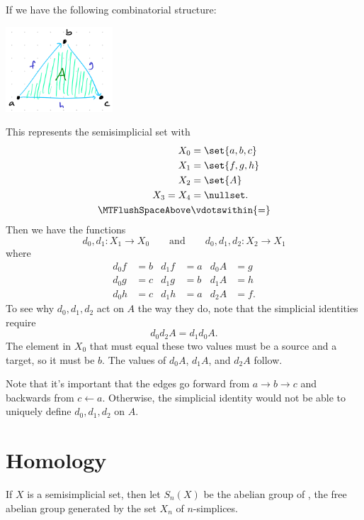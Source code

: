 \documentclass{standalone}
\begin{document}
\begin{example}
  If we have the following combinatorial structure:
  \begin{center}
    \includegraphics[width=0.3\textwidth]{18_905-200904-2.png} %
  \end{center}
  This represents the semisimplicial set with
  \begin{align*}
    X_0 &= \set{a, b, c} \\
    X_1 &= \set{f, g, h} \\
    X_2 &= \set{A} \\
    X_3 = X_4 &= \nullset. \\
    \MTFlushSpaceAbove
    &\vdotswithin{=}
  \end{align*}
  Then we have the functions
  \[
    d_0, d_1 \colon X_1 \to X_0
    \qquad \text{and} \qquad
    d_0, d_1, d_2 \colon X_2 \to X_1
  \]
  where
  \begin{align*}
    d_0 f &= b &
      d_1 f &= a &
      d_0 A &= g \\
    d_0 g &= c &
      d_1 g &= b &
      d_1 A &= h \\
    d_0 h &= c &
      d_1 h &= a &
      d_2 A &= f.
  \end{align*}
  To see why \(d_0, d_1, d_2\) act on \(A\) the way they do,
  note that the simplicial identities require
  \[
    d_0 d_2 A = d_1 d_0 A.
  \]
  The element in \(X_0\) that must equal these two values must be a source
  and a target, so it must be \(b\). The values of \(d_0 A\), \(d_1 A\),
  and \(d_2 A\) follow.
\end{example}

Note that it's important that the edges go forward from \(a \to b \to c\)
and backwards from \(c \gets a\). Otherwise, the simplicial identity would
not be able to uniquely define \(d_0, d_1, d_2\) on \(A\).

\section{Homology}
If \(X\) is a semisimplicial set, then let \(S_n(X)\) be the abelian group
of ,
the free abelian group generated by the set \(X_n\) of \(n\)-simplices.
\end{document}
